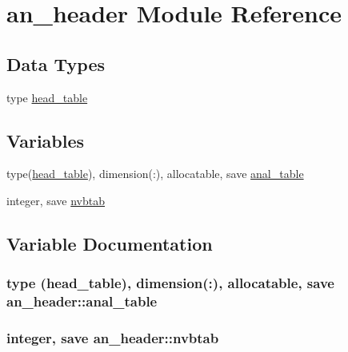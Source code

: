 \hypertarget{namespacean__header}{}\section{an\+\_\+header Module Reference}
\label{namespacean__header}
\subsection*{Data Types}
\begin{DoxyCompactItemize}
\item 
type \hyperlink{structan__header_1_1head__table}{head\+\_\+table}
\end{DoxyCompactItemize}
\subsection*{Variables}
\begin{DoxyCompactItemize}
\item 
type(\hyperlink{structan__header_1_1head__table}{head\+\_\+table}), dimension(\+:), allocatable, save \hyperlink{namespacean__header_ae5d3cd005b4f936e39d8ca9572fad953}{anal\+\_\+table}
\item 
integer, save \hyperlink{namespacean__header_a1f6702c906713337344986a86e036d55}{nvbtab}
\end{DoxyCompactItemize}


\subsection{Variable Documentation}
\subsubsection[{\texorpdfstring{anal\+\_\+table}{anal_table}}]{\setlength{\rightskip}{0pt plus 5cm}type ({\bf head\+\_\+table}), dimension(\+:), allocatable, save an\+\_\+header\+::anal\+\_\+table}\hypertarget{namespacean__header_ae5d3cd005b4f936e39d8ca9572fad953}{}\label{namespacean__header_ae5d3cd005b4f936e39d8ca9572fad953}
\subsubsection[{\texorpdfstring{nvbtab}{nvbtab}}]{\setlength{\rightskip}{0pt plus 5cm}integer, save an\+\_\+header\+::nvbtab}\hypertarget{namespacean__header_a1f6702c906713337344986a86e036d55}{}\label{namespacean__header_a1f6702c906713337344986a86e036d55}
